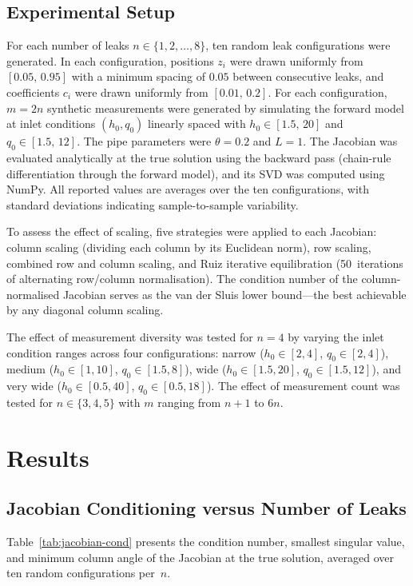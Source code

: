 \subsection{Experimental Setup}

For each number of leaks $n \in \{1, 2, \dots, 8\}$, ten random leak configurations were generated.
In each configuration, positions $z_i$ were drawn uniformly from $[0.05,\, 0.95]$ with a minimum spacing of $0.05$ between consecutive leaks, and coefficients $c_i$ were drawn uniformly from $[0.01,\, 0.2]$.
For each configuration, $m = 2n$ synthetic measurements were generated by simulating the forward model at inlet conditions $(h_0, q_0)$ linearly spaced with $h_0 \in [1.5,\, 20]$ and $q_0 \in [1.5,\, 12]$.
The pipe parameters were $\theta = 0.2$ and $L = 1$.
The Jacobian was evaluated analytically at the true solution using the backward pass (chain-rule differentiation through the forward model), and its SVD was computed using NumPy.
All reported values are averages over the ten configurations, with standard deviations indicating sample-to-sample variability.

To assess the effect of scaling, five strategies were applied to each Jacobian: column scaling (dividing each column by its Euclidean norm), row scaling, combined row and column scaling, and Ruiz iterative equilibration (50~iterations of alternating row/column normalisation).
The condition number of the column-normalised Jacobian serves as the van der Sluis lower bound---the best achievable by any diagonal column scaling.

The effect of measurement diversity was tested for $n = 4$ by varying the inlet condition ranges across four configurations: narrow ($h_0 \in [2, 4]$, $q_0 \in [2, 4]$), medium ($h_0 \in [1, 10]$, $q_0 \in [1.5, 8]$), wide ($h_0 \in [1.5, 20]$, $q_0 \in [1.5, 12]$), and very wide ($h_0 \in [0.5, 40]$, $q_0 \in [0.5, 18]$).
The effect of measurement count was tested for $n \in \{3, 4, 5\}$ with $m$ ranging from $n{+}1$ to $6n$.


\section{Results}\label{sec:cond-results}

\subsection{Jacobian Conditioning versus Number of Leaks}

Table~\ref{tab:jacobian-cond} presents the condition number, smallest singular value, and minimum column angle of the Jacobian at the true solution, averaged over ten random configurations per~$n$.

